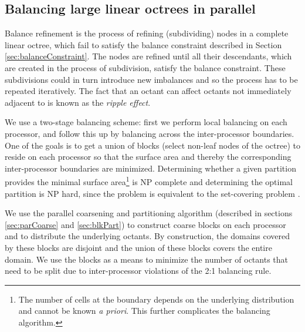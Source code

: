 \subsection{Balancing large linear octrees in parallel}
\label{sec:balance}
Balance refinement is the process of refining (subdividing) nodes in a
complete linear octree, which fail to satisfy the balance constraint
described in Section \ref{sec:balanceConstraint}. The nodes are
refined until all their descendants, which are created in the process
of subdivision, satisfy the balance constraint. These subdivisions
could in turn introduce new imbalances and so the process has to be
repeated iteratively. The fact that an octant can affect octants not
immediately adjacent to is known as the {\em ripple effect}.

We use a two-stage balancing scheme: first we perform local balancing
on each processor, and follow this up by balancing across the
inter-processor boundaries. One of the goals is to get a union of
blocks (select non-leaf nodes of the octree) to reside on each
processor so that the surface area and thereby the corresponding
inter-processor boundaries are minimized. Determining whether a given
partition provides the minimal surface area\footnote{The number of
cells at the boundary depends on the underlying distribution and
cannot be known {\em{a priori}}. This further complicates the
balancing algorithm.} is NP complete and determining the optimal
partition is NP hard, since the problem is equivalent to the
set-covering problem \cite{clr90}.

We use the parallel coarsening and partitioning algorithm (described in
sections \ref{sec:parCoarse} and \ref{sec:blkPart}) to construct
coarse blocks on each processor and to distribute the underlying
octants. By construction, the domains covered by these blocks are
disjoint and the union of these blocks covers the entire domain.  We
use the blocks as a means to minimize the number of octants that need
to be split due to inter-processor violations of the 2:1 balancing
rule.


